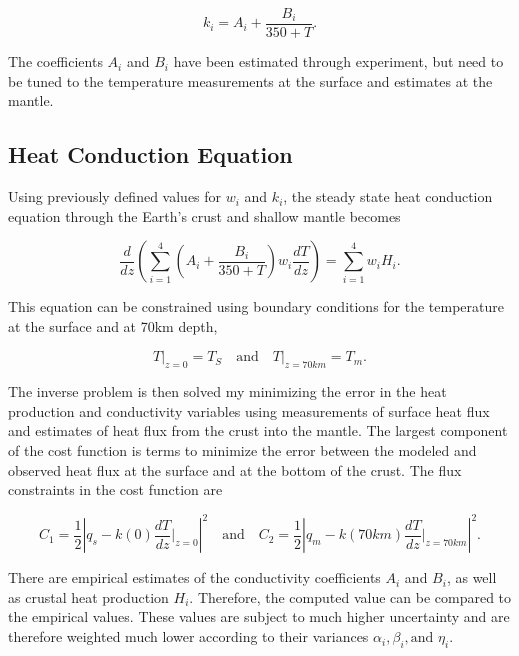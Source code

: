 \documentclass[a4paper,10pt]{article}
\begin{document}
  \begin{equation}
  k_i=A_i+\frac{B_i}{350+T}.
  \end{equation}
  
  \noindent The coefficients $A_i$ and $B_i$ have been estimated through experiment, but need to be tuned to the temperature measurements at the surface and estimates at the mantle.  
  
  \subsection{Heat Conduction Equation}
  
  Using previously defined values for $w_i$ and $k_i$, the steady state heat conduction equation through the Earth's crust and shallow mantle becomes
  
  \begin{equation}
  \frac{d}{dz} \left(\sum_{i=1}^4\left(A_i+\frac{B_i}{350+T}\right)w_i\frac{dT}{dz}\right)=\sum_{i=1}^4w_iH_i.
  \end{equation} 
  
 \noindent This equation can be constrained using boundary conditions for the temperature at the surface and at 70km depth, 
 
 \begin{equation}
 T \Big |_{z=0}=T_S \quad \mbox{and} \quad T \Big |_{z=70km}=T_{m}.
 \end{equation}
 
 \noindent The inverse problem is then solved my minimizing the error in the heat production and conductivity variables using measurements of surface heat flux and estimates of heat flux from the crust into the mantle. The largest component of the cost function is terms to minimize the error between the modeled and observed heat flux at the surface and at the bottom of the crust.  The flux constraints in the cost function are 
 
 \begin{equation}
C_1=\frac{1}{2} \left| q_s-k(0)\frac{dT}{dz}\Big|_{z=0} \right |^2 \quad \mbox{and} \quad C_2=   \frac{1}{2} \left| q_m-k(70km)\frac{dT}{dz}\Big|_{z=70km} \right |^2.
 \end{equation}
 
 \noindent There are empirical estimates of the conductivity coefficients $A_i$ and $B_i$, as well as crustal heat production $H_i$. Therefore, the computed value can be compared to the empirical values. These values are subject to much higher uncertainty and are therefore weighted much lower according to their variances $\alpha_i, \beta_i, \text{and } \eta_i$.  
\end{document}
